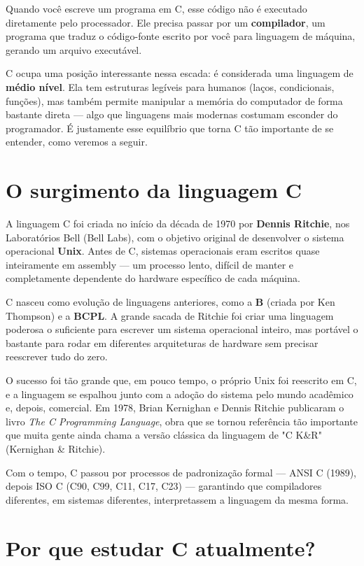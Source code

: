 Quando você escreve um programa em C, esse código não é executado diretamente pelo processador. Ele precisa passar por um \textbf{compilador}, um programa que traduz o código-fonte escrito por você para linguagem de máquina, gerando um arquivo executável.

C ocupa uma posição interessante nessa escada: é considerada uma linguagem de \textbf{médio nível}. Ela tem estruturas legíveis para humanos (laços, condicionais, funções), mas também permite manipular a memória do computador de forma bastante direta — algo que linguagens mais modernas costumam esconder do programador. É justamente esse equilíbrio que torna C tão importante de se entender, como veremos a seguir.


\section{O surgimento da linguagem C}

A linguagem C foi criada no início da década de 1970 por \textbf{Dennis Ritchie}, nos Laboratórios Bell (Bell Labs), com o objetivo original de desenvolver o sistema operacional \textbf{Unix}. Antes de C, sistemas operacionais eram escritos quase inteiramente em assembly — um processo lento, difícil de manter e completamente dependente do hardware específico de cada máquina.

C nasceu como evolução de linguagens anteriores, como a \textbf{B} (criada por Ken Thompson) e a \textbf{BCPL}. A grande sacada de Ritchie foi criar uma linguagem poderosa o suficiente para escrever um sistema operacional inteiro, mas portável o bastante para rodar em diferentes arquiteturas de hardware sem precisar reescrever tudo do zero.

O sucesso foi tão grande que, em pouco tempo, o próprio Unix foi reescrito em C, e a linguagem se espalhou junto com a adoção do sistema pelo mundo acadêmico e, depois, comercial. Em 1978, Brian Kernighan e Dennis Ritchie publicaram o livro \textit{The C Programming Language}, obra que se tornou referência tão importante que muita gente ainda chama a versão clássica da linguagem de "C K\&R" (Kernighan \& Ritchie).

Com o tempo, C passou por processos de padronização formal — ANSI C (1989), depois ISO C (C90, C99, C11, C17, C23) — garantindo que compiladores diferentes, em sistemas diferentes, interpretassem a linguagem da mesma forma.

\section{Por que estudar C atualmente?}

